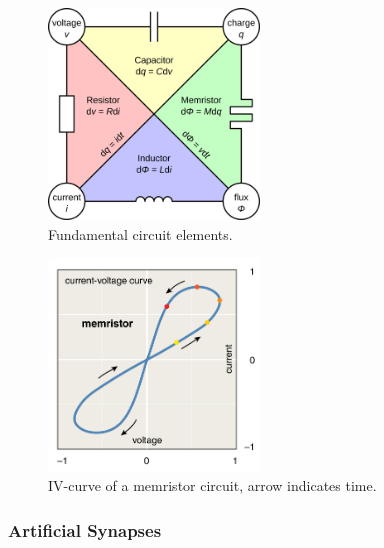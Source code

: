 \begin{figure}[htbp]
	\begin{center}
		\includegraphics[width=0.5\textwidth]{inc/circuit_elements.png}
		\caption{Fundamental circuit elements.\protect\footnotemark}
		\label{fig:circuit_elements}
	\end{center}
\end{figure}

\begin{figure}[htbp]
	\begin{center}
		\includegraphics[width=0.5\textwidth]{inc/pinched_hysteresis.png}
		\caption{IV-curve of a memristor circuit, arrow indicates time.\protect\footnotemark}
		\label{fig:pinched_hysteresis}
	\end{center}
\end{figure}

\subsubsection{Artificial Synapses}

